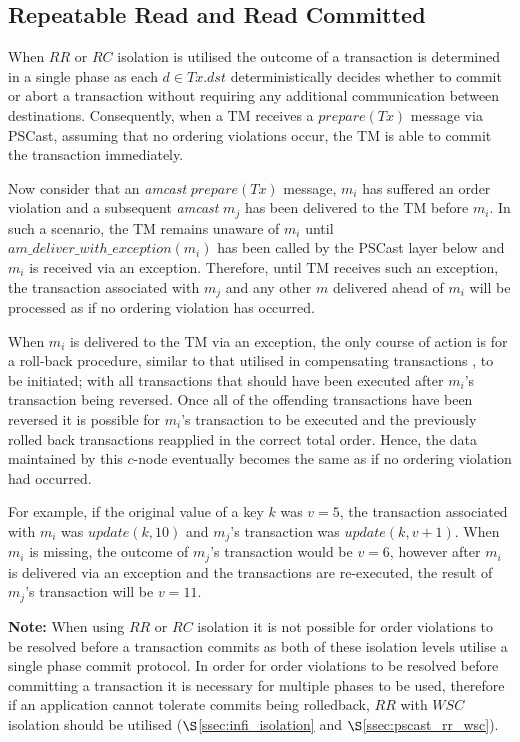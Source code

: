     \subsection{Repeatable Read and Read Committed} \label{ssec:rr_rc_recovery}
    When $RR$ or $RC$ isolation is utilised the outcome of a transaction is determined in a single phase as each $d \in Tx.dst$ deterministically decides whether to commit or abort a transaction without requiring any additional communication between destinations.  Consequently, when a TM receives a $prepare(Tx)$ message via \textsf{PSCast}, assuming that no ordering violations occur, the TM is able to commit the transaction immediately.  
    
    Now consider that an \emph{amcast} $prepare(Tx)$ message, $m_i$ has suffered an order violation and a subsequent \emph{amcast} $m_j$ has been delivered to the TM before $m_i$.  In such a scenario, the TM remains unaware of $m_i$ until $am\_deliver\_with\_exception(m_i)$ has been called by the \textsf{PSCast} layer below and $m_i$ is received via an exception.  Therefore, until TM receives such an exception, the transaction associated with $m_j$ and any other $m$ delivered ahead of $m_i$ will be processed as if no ordering violation has occurred.  
    
    When $m_i$ is delivered to the TM via an exception, the only course of action is for a roll-back procedure, similar to that utilised in compensating transactions \citep{Korth:1990:FAR:645916.671971}, to be initiated; with all transactions that should have been executed after $m_i$'s transaction being reversed.  Once all of the offending transactions have been reversed it is possible for $m_i$'s transaction to be executed and the previously rolled back transactions reapplied in the correct total order.  Hence, the data maintained by this $c$-node eventually becomes the same as if no ordering violation had occurred.  
    
    For example, if the original value of a key $k$ was $v=5$, the transaction associated with $m_i$ was $update(k, 10)$ and $m_j$'s transaction was $update(k, v+1)$.  When $m_i$ is missing, the outcome of $m_j$'s transaction would be $v = 6$, however after $m_i$ is delivered via an exception and the transactions are re-executed, the result of $m_j$'s transaction will be $v = 11$.  
    
    \textbf{Note:} When using $RR$ or $RC$ isolation it is not possible for order violations to be resolved before a transaction commits as both of these isolation levels utilise a single phase commit protocol. In order for order violations to be resolved before committing a transaction it is necessary for multiple phases to be used, therefore if an application cannot tolerate commits being rolledback, $RR$ with $WSC$ isolation should be utilised ($\S$\ref{ssec:infi_isolation} and $\S$\ref{ssec:pscast_rr_wsc}).  
    

